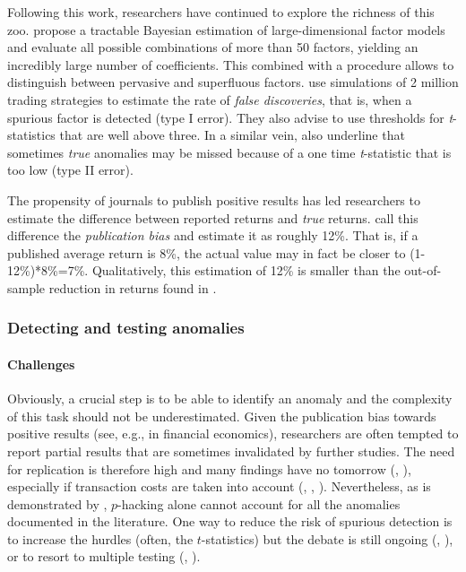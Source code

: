 Following this work, researchers have continued to explore the richness of this zoo. \cite{bryzgalova2019spurious} propose a tractable Bayesian estimation of large-dimensional factor models and evaluate all possible combinations of more than 50 factors, yielding an incredibly large number of coefficients. This combined with a \cite{fama1973risk} procedure allows to distinguish between pervasive and superfluous factors. \cite{chordia2020anomalies} use simulations of 2 million trading strategies to estimate the rate of \textit{false discoveries}, that is, when a spurious factor is detected (type I error). They also advise to use thresholds for \textit{t}-statistics that are well above three. In a similar vein, \cite{harvey2019false} also underline that sometimes \textit{true} anomalies may be missed because of a one time \textit{t}-statistic that is too low (type II error).

The propensity of journals to publish positive results has led researchers to estimate the difference between reported returns and \textit{true} returns. \cite{chen2020limits} call this difference the \textit{publication bias} and estimate it as roughly 12\%. That is, if a published average return is 8\%, the actual value may in fact be closer to (1-12\%)*8\%=7\%. Qualitatively, this estimation of 12\% is smaller than the out-of-sample reduction in returns found in \cite{mclean2016does}.

\subsubsection{Detecting and testing anomalies}

\paragraph{Challenges}

Obviously, a crucial step is to be able to identify an anomaly and the complexity of this task should not be underestimated. Given the publication bias towards positive results (see, e.g., \cite{harvey2017presidential} in financial economics), researchers are often tempted to report partial results that are sometimes invalidated by further studies. The need for replication is therefore high and many findings have no tomorrow (\cite{linnainmaa2018history}, \cite{johannesson2020explanatory}), especially if transaction costs are taken into account (\cite{novy2015taxonomy}, \cite{patton2020you}, \cite{chen2020zeroing}). Nevertheless, as is demonstrated by \cite{chen2020limits}, $p$-hacking alone cannot account for all the anomalies documented in the literature. One way to reduce the risk of spurious detection is to increase the hurdles (often, the $t$-statistics) but the debate is still ongoing (\cite{harvey2016and}, \cite{chen2020t}), or to resort to multiple testing (\cite{harvey2019evaluation}, \cite{vincent2020investment}).

